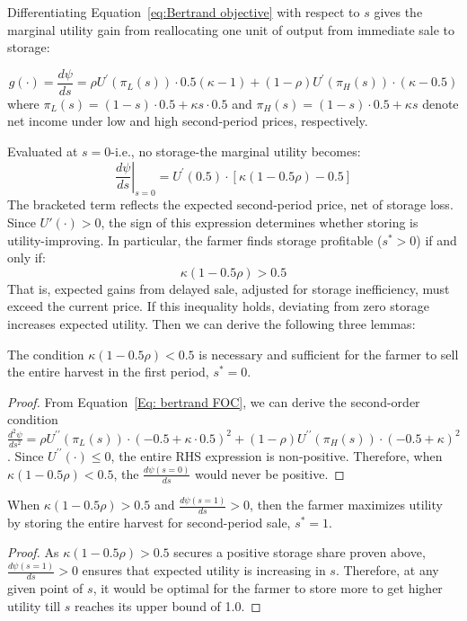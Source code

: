 Differentiating Equation~\ref{eq:Bertrand objective} with respect to $s$ gives the marginal utility gain from reallocating one unit of output from immediate sale to storage:

\begin{equation}
g(\cdot) = \frac{d\psi}{ds} = \rho U^{\prime}(\pi_L(s)) \cdot 0.5(\kappa-1) + (1 - \rho) U^{\prime}(\pi_H(s)) \cdot (\kappa-0.5)
\label{Eq: bertrand FOC}
\end{equation}
where $\pi_L(s) = (1 - s)\cdot 0.5 + \kappa s \cdot 0.5$ and $\pi_H(s) = (1 - s)\cdot 0.5 + \kappa s$ denote net income under low and high second-period prices, respectively.

Evaluated at $s = 0$-i.e., no storage-the marginal utility becomes:
$$
\left.\frac{d\psi}{ds}\right|_{s=0} = U^{\prime}(0.5) \cdot \left[\kappa(1 - 0.5\rho ) - 0.5\right]
$$
The bracketed term reflects the expected second-period price, net of storage loss. Since $U'(\cdot) > 0$, the sign of this expression determines whether storing is utility-improving. In particular, the farmer finds storage profitable ($s^* > 0$) if and only if:
$$
\kappa(1 - 0.5\rho) > 0.5
$$
That is, expected gains from delayed sale, adjusted for storage inefficiency, must exceed the current price. If this inequality holds, deviating from zero storage increases expected utility. Then we can derive the following three lemmas:
\begin{lemma}
    The condition $\kappa (1 - 0.5\rho) < 0.5$ is necessary and sufficient for the farmer to sell the entire harvest in the first period, $s^*=0$.
        \label{lemma: Bertrand no storage solution}
\end{lemma}
\begin{proof}
    From Equation~\ref{Eq: bertrand FOC}, we can derive the second-order condition $\frac{d^2 \psi}{d s^2} = \rho U^{\prime \prime}\left(\pi_L(s)\right) \cdot\left(-0.5+ \kappa \cdot 0.5\right)^2+(1-\rho) U^{\prime \prime}\left(\pi_H(s)\right) \cdot\left(-0.5+\kappa\right)^2$. Since $U^{\prime\prime}(\cdot)\leq0$, the entire RHS expression is non-positive. Therefore, when $\kappa (1-0.5\rho) < 0.5 $, the $\frac{d \psi(s=0)}{d s}$ would never be positive.
\end{proof}


\begin{lemma}
     When $\kappa (1-0.5\rho) > 0.5 $ and $\frac{d \psi(s=1)}{d s}>0$, then the farmer maximizes utility by storing the entire harvest for second-period sale, $s^*=1$.
    \label{lemma: Bertrand full storage solution}
\end{lemma}
\begin{proof}
    As $\kappa (1-0.5\rho) > 0.5 $ secures a positive storage share proven above, $\frac{d \psi(s=1)}{d s}>0$ ensures that expected utility is increasing in $s$. Therefore, at any given point of $s$, it would be optimal for the farmer to store more to get higher utility till $s$ reaches its upper bound of 1.0.
\end{proof}


